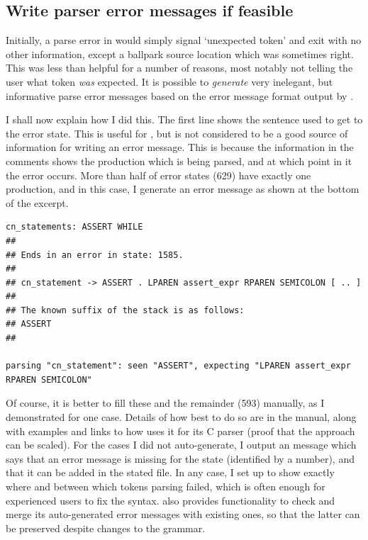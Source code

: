 \subsection{Write parser error messages if feasible}

Initially, a parse error in  would simply signal `unexpected token' and
exit with no other information, except a ballpark source location which was
sometimes right. This was less than helpful for a number of reasons, most
notably not telling the user what token \emph{was} expected. It is possible to
\emph{generate} very inelegant, but informative parse error messages based on
the error message format output by
.

I shall now explain how I did
this. The first line shows the sentence used to get to the error state.
This is useful for , but is not considered to be a good source of
information for writing an error message. This is because the information in
the comments shows the production which is being parsed, and at which point in
it the error occurs. More than half of error states (629) have exactly one
production, and in this case, I generate an error message as shown at the
bottom of the excerpt.

\begin{verbatim}
cn_statements: ASSERT WHILE
##
## Ends in an error in state: 1585.
##
## cn_statement -> ASSERT . LPAREN assert_expr RPAREN SEMICOLON [ .. ]
##
## The known suffix of the stack is as follows:
## ASSERT
##

parsing "cn_statement": seen "ASSERT", expecting "LPAREN assert_expr RPAREN SEMICOLON"
\end{verbatim}

Of course, it is better to fill these and the remainder (593) manually, as I
demonstrated for one
case. Details of how best to do so are in the  manual, along with
examples and links to how  uses it for its C parser (proof that
the approach can be scaled). For the cases I did not auto-generate, I
output an message which says that an error message is missing for the state
(identified by a number), and that it can be added in the stated file. In any
case, I set up  to show exactly where and between which tokens
parsing failed, which is often enough for experienced users to fix the syntax.
 also provides functionality to check and merge its auto-generated
error messages with existing ones, so that the latter can be preserved despite
changes to the grammar.

